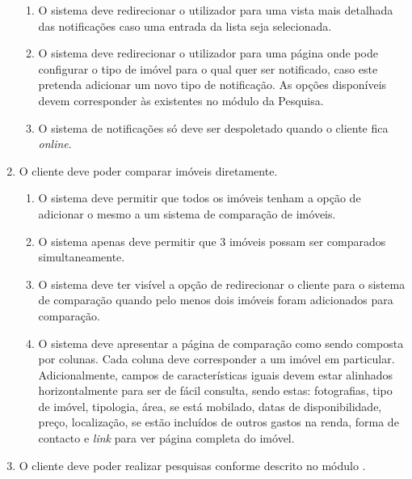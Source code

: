 \begin{enumerate}
\begin{enumerate}
        \item O sistema deve redirecionar o utilizador para uma vista mais detalhada das notificações caso uma entrada da lista seja selecionada.
        \item O sistema deve redirecionar o utilizador para uma página onde pode configurar o
        tipo de imóvel para o qual quer ser notificado, caso este pretenda adicionar um novo tipo de notificação. As opções disponíveis devem corresponder às existentes no módulo da Pesquisa.
        \item O sistema de notificações só deve ser despoletado quando o cliente fica \textit{online}.
    \end{enumerate}
    \item O cliente deve poder comparar imóveis diretamente.
    \begin{enumerate}
        \item O sistema deve permitir que todos os imóveis tenham a opção de adicionar o mesmo a um sistema de comparação de imóveis.
        \item O sistema apenas deve permitir que 3 imóveis possam ser comparados simultaneamente.
        \item O sistema deve ter visível a opção de redirecionar o cliente para o sistema de comparação quando pelo menos dois imóveis foram adicionados para comparação.
        \item O sistema deve apresentar a página de comparação como sendo composta por colunas. Cada coluna deve corresponder a um imóvel em particular. Adicionalmente, campos de características iguais devem estar alinhados horizontalmente para ser de
        fácil consulta, sendo estas: fotografias, tipo de imóvel, tipologia, área, se está mobilado, datas de disponibilidade, preço, localização, se estão incluídos de outros gastos na renda, forma de contacto e \textit{link} para ver página completa do imóvel.
    \end{enumerate}
    \item O cliente deve poder realizar pesquisas conforme descrito no módulo .
\end{enumerate}

